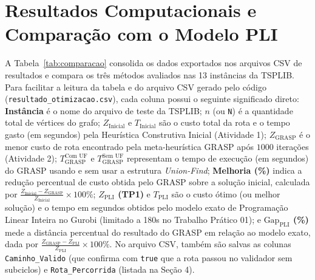 \documentclass[10pt,a4paper]{article}
\begin{document}
\section{Resultados Computacionais e Comparação com o Modelo PLI}
A Tabela~\ref{tab:comparacao} consolida os dados exportados nos arquivos CSV de resultados e compara os três métodos avaliados nas 13 instâncias da TSPLIB. Para facilitar a leitura da tabela e do arquivo CSV gerado pelo código (\texttt{resultado\_otimizacao.csv}), cada coluna possui o seguinte significado direto: \textbf{Instância} é o nome do arquivo de teste da TSPLIB; \textbf{$n$} (ou \texttt{N}) é a quantidade total de vértices do grafo; \textbf{$Z_{\text{Inicial}}$} e \textbf{$T_{\text{Inicial}}$} são o custo total da rota e o tempo gasto (em segundos) pela Heurística Construtiva Inicial (Atividade 1); \textbf{$Z_{\text{GRASP}}$} é o menor custo de rota encontrado pela meta-heurística GRASP após $1000$ iterações (Atividade 2); \textbf{$T_{\text{GRASP}}^{\text{Com UF}}$} e \textbf{$T_{\text{GRASP}}^{\text{Sem UF}}$} representam o tempo de execução (em segundos) do GRASP usando e sem usar a estrutura \textit{Union-Find}; \textbf{Melhoria (\%)} indica a redução percentual de custo obtida pelo GRASP sobre a solução inicial, calculada por $\frac{Z_{\text{Inicial}} - Z_{\text{GRASP}}}{Z_{\text{Inicial}}} \times 100\%$; \textbf{$Z_{\text{PLI}}$ (TP1)} e \textbf{$T_{\text{PLI}}$} são o custo ótimo (ou melhor solução) e o tempo em segundos obtidos pelo modelo exato de Programação Linear Inteira no Gurobi (limitado a 180s no Trabalho Prático 01); e \textbf{$\text{Gap}_{\text{PLI}}$ (\%)} mede a distância percentual do resultado do GRASP em relação ao modelo exato, dada por $\frac{Z_{\text{GRASP}} - Z_{\text{PLI}}}{Z_{\text{PLI}}} \times 100\%$. No arquivo CSV, também são salvas as colunas \texttt{Caminho\_Valido} (que confirma com \texttt{true} que a rota passou no validador sem subciclos) e \texttt{Rota\_Percorrida} (listada na Seção 4).
\end{document}
